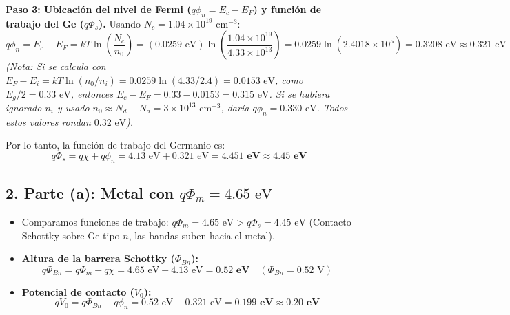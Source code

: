 \documentclass[11pt,a4paper]{article}
\begin{document}
\textbf{Paso 3: Ubicación del nivel de Fermi ($q\phi_n = E_c - E_F$) y función de trabajo del Ge ($q\Phi_s$).}
Usando $N_c = 1.04 \times 10^{19}\text{ cm}^{-3}$:
\[
q\phi_n = E_c - E_F = kT \ln\left(\frac{N_c}{n_0}\right) = (0.0259\text{ eV}) \ln\left(\frac{1.04 \times 10^{19}}{4.33 \times 10^{13}}\right) = 0.0259 \ln(2.4018 \times 10^5) = 0.3208\text{ eV} \approx 0.321\text{ eV}
\]
\textit{(Nota: Si se calcula con $E_F - E_i = kT \ln(n_0/n_i) = 0.0259 \ln(4.33/2.4) = 0.0153\text{ eV}$, como $E_g/2 = 0.33\text{ eV}$, entonces $E_c - E_F = 0.33 - 0.0153 = 0.315\text{ eV}$. Si se hubiera ignorado $n_i$ y usado $n_0 \approx N_d - N_a = 3 \times 10^{13}\text{ cm}^{-3}$, daría $q\phi_n = 0.330\text{ eV}$. Todos estos valores rondan $0.32\text{ eV}$).}

Por lo tanto, la función de trabajo del Germanio es:
\[
q\Phi_s = q\chi + q\phi_n = 4.13\text{ eV} + 0.321\text{ eV} = \mathbf{4.451\text{ eV} \approx 4.45\text{ eV}}
\]

\subsection*{2. Parte (a): Metal con $q\Phi_m = 4.65\text{ eV}$}
\begin{itemize}
    \item Comparamos funciones de trabajo: $q\Phi_m = 4.65\text{ eV} > q\Phi_s = 4.45\text{ eV}$ (Contacto Schottky sobre Ge tipo-$n$, las bandas suben hacia el metal).
    \item \textbf{Altura de la barrera Schottky ($\Phi_{Bn}$):}
    \[
    q\Phi_{Bn} = q\Phi_m - q\chi = 4.65\text{ eV} - 4.13\text{ eV} = \mathbf{0.52\text{ eV}} \quad (\Phi_{Bn} = 0.52\text{ V})
    \]
    \item \textbf{Potencial de contacto ($V_0$):}
    \[
    qV_0 = q\Phi_{Bn} - q\phi_n = 0.52\text{ eV} - 0.321\text{ eV} = \mathbf{0.199\text{ eV} \approx 0.20\text{ eV}}
    \]
\end{itemize}
\end{document}
